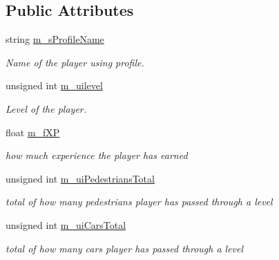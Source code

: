 \subsection*{Public Attributes}
\begin{DoxyCompactItemize}
\item 
\hypertarget{class_profile_a5f0bae7cea5466440b5175a418909db7}{}\label{class_profile_a5f0bae7cea5466440b5175a418909db7} 
string \hyperlink{class_profile_a5f0bae7cea5466440b5175a418909db7}{m\+\_\+s\+Profile\+Name}
\begin{DoxyCompactList}\small\item\em Name of the player using profile. \end{DoxyCompactList}\item 
\hypertarget{class_profile_af0e3b9cdcf409029d4dbedeb08c556d6}{}\label{class_profile_af0e3b9cdcf409029d4dbedeb08c556d6} 
unsigned int \hyperlink{class_profile_af0e3b9cdcf409029d4dbedeb08c556d6}{m\+\_\+uilevel}
\begin{DoxyCompactList}\small\item\em Level of the player. \end{DoxyCompactList}\item 
\hypertarget{class_profile_a80b39b98107c13ddb7b0cc22f62f9a9d}{}\label{class_profile_a80b39b98107c13ddb7b0cc22f62f9a9d} 
float \hyperlink{class_profile_a80b39b98107c13ddb7b0cc22f62f9a9d}{m\+\_\+f\+XP}
\begin{DoxyCompactList}\small\item\em how much experience the player has earned \end{DoxyCompactList}\item 
\hypertarget{class_profile_abe8f54c015b06ad58f59d59fcca02bad}{}\label{class_profile_abe8f54c015b06ad58f59d59fcca02bad} 
unsigned int \hyperlink{class_profile_abe8f54c015b06ad58f59d59fcca02bad}{m\+\_\+ui\+Pedestrians\+Total}
\begin{DoxyCompactList}\small\item\em total of how many pedestrians player has passed through a level \end{DoxyCompactList}\item 
\hypertarget{class_profile_a735b68ae846ce7fe33adc71ddf7ae301}{}\label{class_profile_a735b68ae846ce7fe33adc71ddf7ae301} 
unsigned int \hyperlink{class_profile_a735b68ae846ce7fe33adc71ddf7ae301}{m\+\_\+ui\+Cars\+Total}
\begin{DoxyCompactList}\small\item\em total of how many cars player has passed through a level \end{DoxyCompactList}\item 

\end{DoxyCompactItemize}
